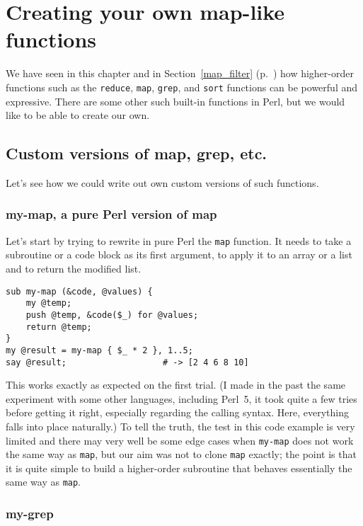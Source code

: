 \section{Creating your own map-like functions}
 
We have seen in this chapter and in 
Section~\ref{map_filter} (p.~\pageref{map_filter}) 
how higher-order functions such as the {\tt reduce}, 
{\tt map}, {\tt grep}, and {\tt sort} functions 
can be powerful and expressive. There are some 
other such built-in functions in Perl, but we would 
like to be able to create our own.

\subsection{Custom versions of map, grep, etc.}

Let's see how we could write out own custom versions 
of such functions.

\subsubsection{my-map, a pure Perl version of map}

Let's start by trying to rewrite in pure Perl the 
{\tt map} function. It needs to take a subroutine 
or a code block as its first argument, to apply it 
to an array or a list and to return the modified 
list.

\begin{verbatim}
sub my-map (&code, @values) { 
    my @temp;
    push @temp, &code($_) for @values;
    return @temp;
}
my @result = my-map { $_ * 2 }, 1..5; 
say @result;                   # -> [2 4 6 8 10]
\end{verbatim}

This works exactly as expected on the first trial. 
(I made in the past the same experiment with some 
other languages, including Perl~5, it took quite 
a few tries before getting it right, especially 
regarding the calling syntax. Here, everything 
falls into place naturally.) To tell the truth, 
the test in this code example is very limited and 
there may very well be some edge cases when 
{\tt my-map} does not work the same way as {\tt map}, 
but our aim was not to clone {\tt map} exactly; 
the point is that it is quite simple to build a 
higher-order subroutine that behaves essentially the 
same way as {\tt map}. 

\subsubsection{my-grep}

